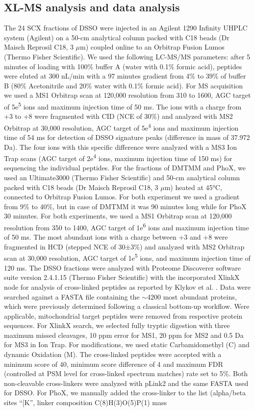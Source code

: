 \subsection*{XL-MS analysis and data analysis}
The 24 SCX fractions of DSSO were injected in an Agilent 1290 Infinity UHPLC system (Agilent) on a 50-cm analytical column packed with C18 beads (Dr Maisch Reprosil C18, 3 $\mu$m) coupled online to an Orbitrap Fusion Lumos (Thermo Fisher Scientific). We used the following LC-MS/MS parameters: after 5 minutes of loading with 100\% buffer A (water with 0.1\% formic acid), peptides were eluted at 300 nL/min with a 97 minutes gradient from 4\% to 39\% of buffer B (80\% Acetonitrile and 20\% water with 0.1\% formic acid). For MS acquisition we used a MS1 Orbitrap scan at 120,000 resolution from 310 to 1600, AGC target of 5e\textsuperscript{5} ions and maximum injection time of 50 ms. The ions with a charge from +3 to +8 were fragmented with CID (NCE of 30\%) and analyzed with MS2 Orbitrap at 30,000 resolution, AGC target of 5e\textsuperscript{4} ions and maximum injection time of 54 ms for detection of DSSO signature peaks (difference in mass of 37.972 Da). The four ions with this specific difference were analyzed with a MS3 Ion Trap scans (AGC target of 2e\textsuperscript{4} ions, maximum injection time of 150 ms) for sequencing the individual peptides. For the fractions of DMTMM and PhoX, we used an Ultimate3000 (Thermo Fisher Scientific) and 50-cm analytical column packed with C18 beads (Dr Maisch Reprosil C18, 3 $\mu$m) heated at 45°C, connected to Orbitrap Fusion Lumos. For both experiment we used a gradient from 9\% to 40\%, but in case of DMTMM it was 90 minutes long while for PhoX 30 minutes. For both experiments, we used a MS1 Orbitrap scan at 120,000 resolution from 350 to 1400, AGC target of 1e\textsuperscript{6} ions and maximum injection time of 50 ms. The most abundant ions with a charge between +3 and +8 were fragmented in HCD (stepped NCE of 30±3\%) and analyzed with MS2 Orbitrap scan at 30,000 resolution, AGC target of 1e\textsuperscript{5} ions, and maximum injection time of 120 ms. The DSSO fractions were analyzed with Proteome Discoverer software suite version 2.4.1.15 (Thermo Fisher Scientific) with the incorporated XlinkX node for analysis of cross-linked peptides as reported by Klykov et al. \cite{RN64}. Data were searched against a FASTA file containing the $\sim$4200 most abundant proteins, which were previously determined following a classical bottom-up workflow. Were applicable, mitochondrial target peptides were removed from respective protein sequences. For XlinkX search, we selected fully tryptic digestion with three maximum missed cleavages, 10 ppm error for MS1, 20 ppm for MS2 and 0.5 Da for MS3 in Ion Trap. For modifications, we used static Carbamidomethyl (C) and dynamic Oxidation (M). The cross-linked peptides were accepted with a minimum score of 40, minimum score difference of 4 and maximum FDR (controlled at PSM level for cross-linked spectrum matches) rate set to 5\%. Both non-cleavable cross-linkers were analyzed with pLink2 \cite{RN65} and the same FASTA used for DSSO. For PhoX, we manually added the cross-linker to the list (alpha/beta sites “[K”, linker composition C(8)H(3)O(5)P(1) mass 